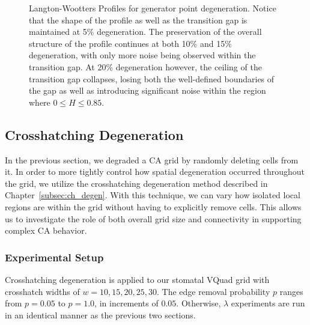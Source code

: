 \documentclass[a4paper,11pt]{report}
\begin{document}
\begin{figure}[htp]
\caption[Langton-Wootters Profile for Generator Point Degeneration]{
  Langton-Wootters Profiles for generator point degeneration. Notice that the shape of the profile as well as the transition gap is maintained at 5\% degeneration. The preservation of the overall structure of the profile continues at both 10\% and 15\% degeneration, with only more noise being observed within the transition gap. At 20\% degeneration however, the ceiling of the transition gap collapses, losing both the well-defined boundaries of the gap as well as introducing significant noise within the region where $0 \le H \le 0.85$.
}
\label{fig:lw_gen_pt_degen}
\end{figure}

\subsection{Crosshatching Degeneration}

In the previous section, we degraded a CA grid by randomly deleting cells from it. In order to more tightly control how spatial degeneration occurred throughout the grid, we utilize the crosshatching degeneration method described in Chapter~\ref{subsec:ch_degen}. With this technique, we can vary how isolated local regions are within the grid without having to explicitly remove cells. This allows us to investigate the role of both overall grid size and connectivity in supporting complex CA behavior.

\subsubsection*{Experimental Setup}
Crosshatching degeneration is applied to our stomatal VQuad grid with crosshatch widths of $w=10,15,20,25,30$. The edge removal probability $p$ ranges from $p=0.05$ to $p=1.0$, in increments of $0.05$. Otherwise, $\lambda$ experiments are run in an identical manner as the previous two sections.
\end{document}
